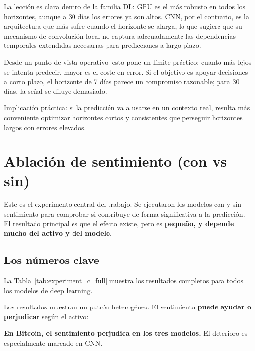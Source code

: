 La lección es clara dentro de la familia DL: GRU es el más robusto en todos los horizontes, aunque a 30 días los errores ya son altos. CNN, por el contrario, es la arquitectura que más sufre cuando el horizonte se alarga, lo que sugiere que su mecanismo de convolución local no captura adecuadamente las dependencias temporales extendidas necesarias para predicciones a largo plazo.

Desde un punto de vista operativo, esto pone un límite práctico: cuanto más lejos se intenta predecir, mayor es el coste en error. Si el objetivo es apoyar decisiones a corto plazo, el horizonte de 7 días parece un compromiso razonable; para 30 días, la señal se diluye demasiado.

Implicación práctica: si la predicción va a usarse en un contexto real, resulta más conveniente optimizar horizontes cortos y consistentes que perseguir horizontes largos con errores elevados.


\section{Ablación de sentimiento (con vs sin)}

Este es el experimento central del trabajo. Se ejecutaron los modelos con y sin sentimiento para comprobar si contribuye de forma significativa a la predicción. El resultado principal es que el efecto existe, pero es \textbf{pequeño, y depende mucho del activo y del modelo}.

\subsection{Los números clave}

La Tabla~\ref{tab:experiment_c_full} muestra los resultados completos para todos los modelos de deep learning.

\begin{table}[H]
\centering
\caption{MAPE (\%) por modelo y activo, con y sin sentimiento}
\label{tab:experiment_c_full}

\end{table}

Los resultados muestran un patrón heterogéneo. El sentimiento \textbf{puede ayudar o perjudicar} según el activo:

\textbf{En Bitcoin, el sentimiento perjudica en los tres modelos.} El deterioro es especialmente marcado en CNN.


